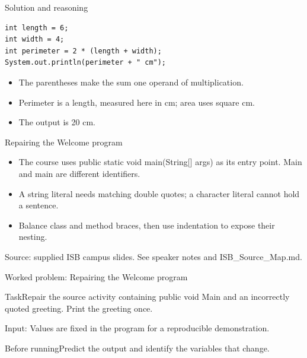 \documentclass[10pt,aspectratio=169]{beamer}
\begin{document}
\begin{frame}[fragile,t]{Solution and reasoning}
\begin{lstlisting}
int length = 6;
int width = 4;
int perimeter = 2 * (length + width);
System.out.println(perimeter + " cm");
\end{lstlisting}\vspace{1mm}\small\begin{itemize}
\item The parentheses make the sum one operand of multiplication.
\item Perimeter is a length, measured here in cm; area uses square cm.
\item The output is 20 cm.
\end{itemize}
\end{frame}

\begin{frame}[fragile,t]{Repairing the Welcome program}
\begin{itemize}
\item The course uses public static void main(String[] args) as its entry point. Main and main are different identifiers.
\item A string literal needs matching double quotes; a character literal cannot hold a sentence.
\item Balance class and method braces, then use indentation to expose their nesting.
\end{itemize}
\vspace{3mm}\footnotesize\textcolor{accent}{Source: supplied ISB campus slides. See speaker notes and ISB\_Source\_Map.md.}
\end{frame}

\begin{frame}[fragile,t]{Worked problem: Repairing the Welcome program}
\begin{block}{Task}Repair the source activity containing public void Main and an incorrectly quoted greeting. Print the greeting once.\end{block}
\small Input: Values are fixed in the program for a reproducible demonstration.\par\vspace{3mm}\begin{exampleblock}{Before running}Predict the output and identify the variables that change.\end{exampleblock}
\end{frame}
\end{document}
